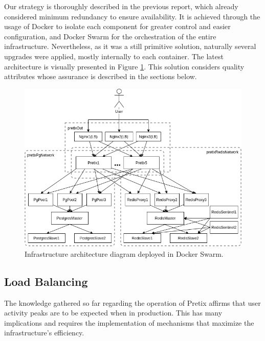 \documentclass[12pt]{article}
\begin{document}
Our strategy is thoroughly described in the previous report, which already considered minimum redundancy to ensure availability.
It is achieved through the usage of Docker to isolate each component for greater control and easier configuration, and Docker Swarm for the orchestration of
the entire infrastructure.
Nevertheless, as it was a still primitive solution, naturally several upgrades were applied, mostly internally to each container.
The latest architecture is visually presented in Figure \ref{fig:InfrastructureArchitecture}.
This solution considers quality attributes whose assurance is described in the sections below.

\begin{figure}[H]
  \centering
  \begin{minipage}{.85\textwidth}
    \centering
    \includegraphics[width=\linewidth]{diagrams/InfrastructureArchitecture.png}
  \end{minipage}%
  \caption{Infrastructure architecture diagram deployed in Docker Swarm.}
  \label{fig:InfrastructureArchitecture}
\end{figure}

\subsection{Load Balancing} \label{architecture.loadbalancing} %


The knowledge gathered so far regarding the operation of Pretix affirms that user activity peaks are to be expected when in production.
This has many implications and requires the implementation of mechanisms that maximize the infrastructure's efficiency.
\end{document}

